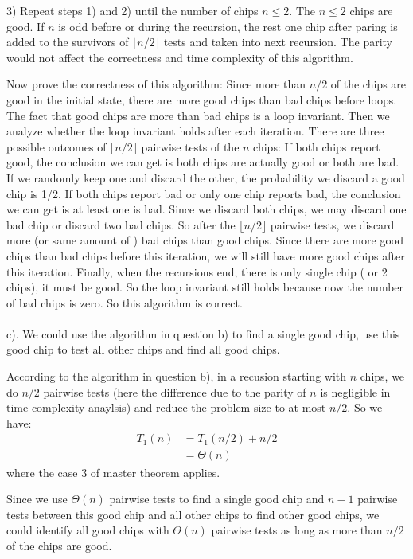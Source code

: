 \documentclass[twoside,11pt]{homework}
\begin{document}
3) Repeat steps 1) and 2) until the number of chips $n \le 2$.
The $n \le 2$ chips are good.
If $n$ is odd before or during the recursion, the rest one chip after paring is added to the survivors of $\lfloor n/2 \rfloor$ tests and taken into next recursion.
The parity would not affect the correctness and time complexity of this algorithm.

Now prove the correctness of this algorithm:
Since more than $n/2$ of the chips are good in the initial state, there are more good chips than bad chips before loops.
The fact that good chips are more than bad chips is a loop invariant.
Then we analyze whether the loop invariant holds after each iteration.
There are three possible outcomes of $\lfloor n/2 \rfloor$ pairwise tests of the $n$ chips:
If both chips report good, the conclusion we can get is both chips are actually good or both are bad. If we randomly keep one and discard the other, the probability we discard a good chip is 1/2.
If both chips report bad or only one chip reports bad, the conclusion we can get is at least one is bad. Since we discard both chips, we may discard one bad chip or discard two bad chips.
So after the $\lfloor n/2 \rfloor$ pairwise tests, we discard more (or same amount of ) bad chips than good chips.
Since there are more good chips than bad chips before this iteration, we will still have more good chips after this iteration.
Finally, when the recursions end, there is only single chip ( or 2 chips), it must be good. So the loop invariant still holds because now the number of bad chips is zero.
So this algorithm is correct.
\\\\
c).
We could use the algorithm in question b) to find a single good chip, use this good chip to test all other chips and find all good chips.

According to the algorithm in question b), in a recusion starting with $n$ chips, we do $n/2$ pairwise tests  (here the difference due to the parity of $n$ is negligible in time complexity anaylsis) and reduce the problem size to at most $n/2$. 
So we have:
%
\begin{equation}
\begin{split}
 T_1(n) &= T_1(n/2) + n/2 \\
         & = \Theta (n)
\end{split}
\end{equation}
%
where the case 3 of master theorem applies.

Since we use $\Theta (n)$ pairwise tests to find a single good chip and $n-1$ pairwise tests between this good chip and all other chips to find other good chips, we could identify all good chips with $\Theta (n)$ pairwise tests as long as more than $n/2$ of the chips are good.
\end{document}
